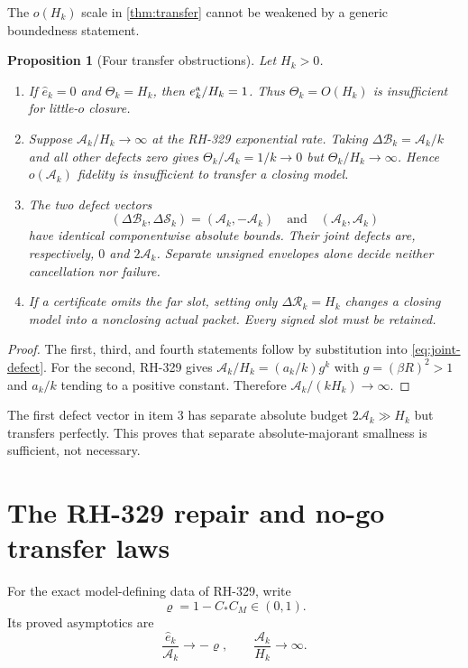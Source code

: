 \documentclass[11pt]{article}
\newtheorem{proposition}[theorem]{Proposition}
\theoremstyle{remark}
\newcommand{\cA}{\mathcal A}
\newcommand{\cB}{\mathcal B}
\newcommand{\cR}{\mathcal R}
\newcommand{\cS}{\mathcal S}
\newcommand{\wh}[1]{\widehat{#1}}
\begin{document}
The $o(H_k)$ scale in \cref{thm:transfer} cannot be weakened by a generic
boundedness statement.

\begin{proposition}[Four transfer obstructions]
\label{prop:obstructions}
Let $H_k>0$.
\begin{enumerate}
\item If $\wh e_k=0$ and $\Theta_k=H_k$, then
$e_k^{\rm a}/H_k=1$.  Thus $\Theta_k=O(H_k)$ is insufficient for
little-$o$ closure.
\item Suppose $\cA_k/H_k\to\infty$ at the RH-329 exponential rate.  Taking
$\Delta\cB_k=\cA_k/k$ and all other defects zero gives
$\Theta_k/\cA_k=1/k\to0$ but
$\Theta_k/H_k\to\infty$.  Hence $o(\cA_k)$ fidelity is insufficient to
transfer a closing model.
\item The two defect vectors
\[
 (\Delta\cB_k,\Delta\cS_k)=(\cA_k,-\cA_k)
 \quad\text{and}\quad
 (\cA_k,\cA_k)
\]
have identical componentwise absolute bounds.  Their joint defects are,
respectively, $0$ and $2\cA_k$.  Separate unsigned envelopes alone decide
neither cancellation nor failure.
\item If a certificate omits the far slot, setting only
$\Delta\cR_k=H_k$ changes a closing model into a nonclosing actual packet.
Every signed slot must be retained.
\end{enumerate}
\end{proposition}

\begin{proof}
The first, third, and fourth statements follow by substitution into
\eqref{eq:joint-defect}.  For the second, RH-329 gives
$\cA_k/H_k=(a_k/k)g^k$ with $g=(\beta R)^2>1$ and $a_k/k$ tending to a
positive constant.  Therefore
$\cA_k/(kH_k)\to\infty$.
\end{proof}

The first defect vector in item 3 has separate absolute budget
$2\cA_k\gg H_k$ but transfers perfectly.  This proves that separate
absolute-majorant smallness is sufficient, not necessary.

\section{The RH-329 repair and no-go transfer laws}

For the exact model-defining data of RH-329, write
\begin{equation}
 \varrho=1-C_*C_M\in(0,1).
 \label{eq:rho}
\end{equation}
Its proved asymptotics are
\begin{equation}
 \frac{\wh e_k}{\cA_k}\longrightarrow-\varrho,
 \qquad
 \frac{\cA_k}{H_k}\longrightarrow\infty.
 \label{eq:rh329-limits}
\end{equation}
\end{document}
